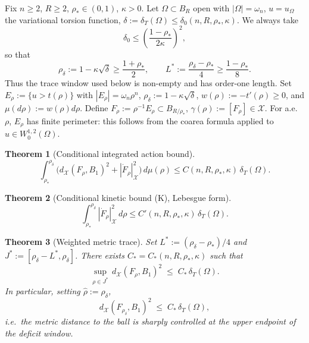 \documentclass[11pt]{article}
\newtheorem{theorem}{Theorem}[section]
\theoremstyle{definition}
\newcommand{\Om}{\Omega}
\newcommand{\rstar}{\rho_{*}}
\newcommand{\rhad}{\widehat\rho}
\newcommand{\X}{\mathcal X}
\begin{document}
Fix $n\ge 2$, $R\ge 2$, $\rstar\in(0,1)$, $\kappa>0$. Let $\Om\subset B_R$
open with $|\Om|=\omega_n$, $u=u_\Om$ the variational torsion function,
$\delta:=\delta_T(\Om)\le\delta_0(n,R,\rstar,\kappa)$.  We always take
\begin{equation}\label{eq:delta-smallness}
   \delta_0\le \left(\frac{1-\rstar}{2\kappa}\right)^2,
\end{equation}
so that
\[
   \rho_\delta:=1-\kappa\sqrt\delta\ge\frac{1+\rstar}{2},
   \qquad
   L^*:=\frac{\rho_\delta-\rstar}{4}\ge\frac{1-\rstar}{8}.
\]
Thus the trace window used below is non-empty and has order-one length.
Set $E_\rho:=\{u>t(\rho)\}$
with $|E_\rho|=\omega_n\rho^n$, $\rho_\delta:=1-\kappa\sqrt\delta$,
$w(\rho):=-t'(\rho)\ge0$, and $\mu(d\rho):=w(\rho)d\rho$. Define
$F_\rho:=\rho^{-1}E_\rho\subset B_{R/\rstar}$, $\gamma(\rho):=[F_\rho]\in\X$.
For a.e.\ $\rho$, $E_\rho$ has finite perimeter: this follows from the
coarea formula applied to $u\in W^{1,2}_0(\Om)$.

\begin{theorem}[Conditional integrated action bound]\label{thm:52int}
\begin{equation}\label{eq:52int}
   \int_{\rstar}^{\rho_\delta}\bigl(d_\X(F_\rho,B_1)^2+|\dot F_\rho|_\X^2\bigr)\,d\mu(\rho)
   \le C(n,R,\rstar,\kappa)\,\delta_T(\Om).
\end{equation}
\end{theorem}

\begin{theorem}[Conditional kinetic bound (K), Lebesgue form]\label{thm:K}
\begin{equation}\label{eq:K}
   \int_{\rstar}^{\rho_\delta}|\dot F_\rho|_\X^2\,d\rho
   \le C'(n,R,\rstar,\kappa)\,\delta_T(\Om).
\end{equation}
\end{theorem}

\begin{theorem}[Weighted metric trace]\label{thm:trace}
Set $L^*:=(\rho_\delta-\rstar)/4$ and
$J^*:=[\rho_\delta-L^*,\rho_\delta]$.  There exists $C_*=C_*(n,R,\rstar,\kappa)$
such that
\begin{equation}\label{eq:trace-uniform}
   \sup_{\rho\in J^*}\,d_\X(F_\rho,B_1)^2\;\le\;C_*\,\delta_T(\Om).
\end{equation}
In particular, setting $\rhad:=\rho_\delta$,
\begin{equation}\label{eq:trace-endpoint}
   d_\X(F_{\rho_\delta},B_1)^2\;\le\;C_*\,\delta_T(\Om),
\end{equation}
i.e.\ the metric distance to the ball is sharply controlled at the
upper endpoint of the deficit window.
\end{theorem}
\end{document}
